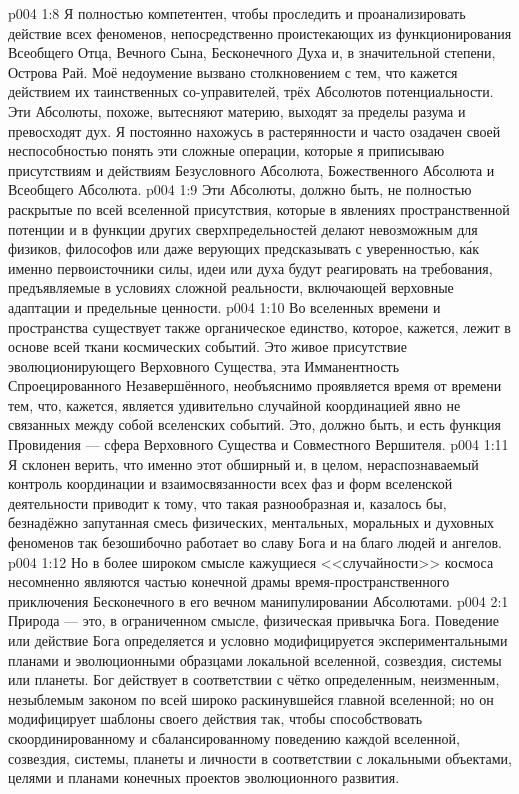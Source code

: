\vs p004 1:8 Я полностью компетентен, чтобы проследить и проанализировать действие всех феноменов, непосредственно проистекающих из функционирования Всеобщего Отца, Вечного Сына, Бесконечного Духа и, в значительной степени, Острова Рай. Моё недоумение вызвано столкновением с тем, что кажется действием их таинственных со\hyp{}управителей, трёх Абсолютов потенциальности. Эти Абсолюты, похоже, вытесняют материю, выходят за пределы разума и превосходят дух. Я постоянно нахожусь в растерянности и часто озадачен своей неспособностью понять эти сложные операции, которые я приписываю присутствиям и действиям Безусловного Абсолюта, Божественного Абсолюта и Всеобщего Абсолюта.
\vs p004 1:9 Эти Абсолюты, должно быть, не полностью раскрытые по всей вселенной присутствия, которые в явлениях пространственной потенции и в функции других сверхпредельностей делают невозможным для физиков, философов или даже верующих предсказывать с уверенностью, к\'ак именно первоисточники силы, идеи или духа будут реагировать на требования, предъявляемые в условиях сложной реальности, включающей верховные адаптации и предельные ценности.
\vs p004 1:10 \pc Во вселенных времени и пространства существует также органическое единство, которое, кажется, лежит в основе всей ткани космических событий. Это живое присутствие эволюционирующего Верховного Существа, эта Имманентность Спроецированного Незавершённого, необъяснимо проявляется время от времени тем, что, кажется, является удивительно случайной координацией явно не связанных между собой вселенских событий. Это, должно быть, и есть функция Провидения --- сфера Верховного Существа и Совместного Вершителя.
\vs p004 1:11 Я склонен верить, что именно этот обширный и, в целом, нераспознаваемый контроль координации и взаимосвязанности всех фаз и форм вселенской деятельности приводит к тому, что такая разнообразная и, казалось бы, безнадёжно запутанная смесь физических, ментальных, моральных и духовных феноменов так безошибочно работает во славу Бога и на благо людей и ангелов.
\vs p004 1:12 Но в более широком смысле кажущиеся <<случайности>> космоса несомненно являются частью конечной драмы время\hyp{}пространственного приключения Бесконечного в его вечном манипулировании Абсолютами.
\vs p004 2:1 Природа --- это, в ограниченном смысле, физическая привычка Бога. Поведение или действие Бога определяется и условно модифицируется экспериментальными планами и эволюционными образцами локальной вселенной, созвездия, системы или планеты. Бог действует в соответствии с чётко определенным, неизменным, незыблемым законом по всей широко раскинувшейся главной вселенной; но он модифицирует шаблоны своего действия так, чтобы способствовать скоординированному и сбалансированному поведению каждой вселенной, созвездия, системы, планеты и личности в соответствии с локальными объектами, целями и планами конечных проектов эволюционного развития.
